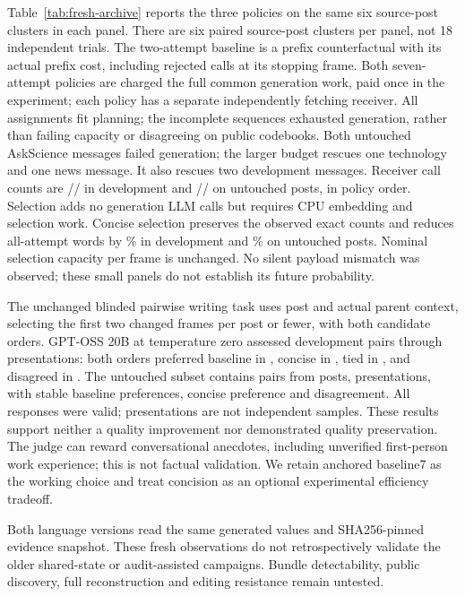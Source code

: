 Table~\ref{tab:fresh-archive} reports the three policies on the same six source-post clusters in each panel. There are six paired source-post clusters per panel, not 18 independent trials. The two-attempt baseline is a prefix counterfactual with its actual prefix cost, including rejected calls at its stopping frame. Both seven-attempt policies are charged the full common generation work, paid once in the experiment; each policy has a separate independently fetching receiver. All assignments fit planning; the incomplete sequences exhausted generation, rather than failing capacity or disagreeing on public codebooks. Both untouched AskScience messages failed generation; the larger budget rescues one technology and one news message. It also rescues two development messages. Receiver call counts are \FreshDevTwoReceiverCalls/\FreshDevSevenReceiverCalls/\FreshDevConciseReceiverCalls{} in development and \FreshHeldTwoReceiverCalls/\FreshHeldSevenReceiverCalls/\FreshHeldConciseReceiverCalls{} on untouched posts, in policy order. Selection adds no generation LLM calls but requires CPU embedding and selection work. Concise selection preserves the observed exact counts and reduces all-attempt words by \FreshDevSaving\% in development and \FreshHeldSaving\% on untouched posts. Nominal selection capacity per frame is unchanged. No silent payload mismatch was observed; these small panels do not establish its future probability.

The unchanged blinded pairwise writing task uses post and actual parent context, selecting the first two changed frames per post or fewer, with both candidate orders. GPT-OSS 20B at temperature zero assessed \FreshDevPairs{} development pairs through \FreshDevOrders{} presentations: both orders preferred baseline in \FreshDevBaselineWins{}, concise in \FreshDevConciseWins{}, tied in \FreshDevTies{}, and disagreed in \FreshDevDiscordant{}. The untouched subset contains \FreshHeldPairs{} pairs from \FreshHeldQualityPosts{} posts, \FreshHeldOrders{} presentations, with \FreshHeldBaselineWins{} stable baseline preferences, \FreshHeldConciseWins{} concise preference and \FreshHeldDiscordant{} disagreement. All responses were valid; presentations are not independent samples. These results support neither a quality improvement nor demonstrated quality preservation. The judge can reward conversational anecdotes, including unverified first-person work experience; this is not factual validation. We retain anchored baseline7 as the working choice and treat concision as an optional experimental efficiency tradeoff.

Both language versions read the same generated values and SHA256-pinned evidence snapshot. These fresh observations do not retrospectively validate the older shared-state or audit-assisted campaigns. Bundle detectability, public discovery, full reconstruction and editing resistance remain untested.
